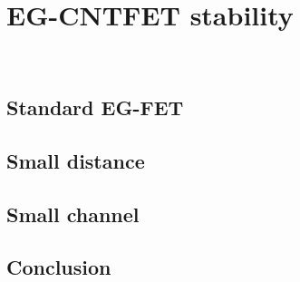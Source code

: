 \chapter{EG-CNTFET stability}
\label{cap:chapter3}



\newpage
\thispagestyle{empty}
\ %
\newpage


\section{Standard EG-FET}
\label{sec:big_channel}




\section{Small distance}
\label{sec:small_distance}




\section{Small channel}
\label{sec:small_channel}




\section{Conclusion}
\label{sec:stability_conclusion}


\newpage
\thispagestyle{empty}
\ %
\newpage
